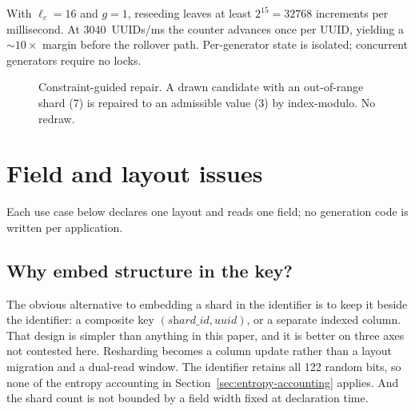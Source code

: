 \documentclass{svproc}
\begin{document}
With $\ell_c=16$ and $g=1$, reseeding leaves at least $2^{15}=32768$ increments per millisecond. At 3040~UUIDs/ms the counter advances once per UUID, yielding a $\sim10\times$ margin before the rollover path. Per-generator state is isolated; concurrent generators require no locks.

\begin{figure}[!ht]
\centering
{}
\caption{Constraint-guided repair. A drawn candidate with an out-of-range
shard (7) is repaired to an admissible value (3) by index-modulo.
No redraw.}
\label{fig:pipeline}
\end{figure}

\section{Field and layout issues}
\label{sec:applications}
Each use case below declares one layout and reads one field; no
generation code is written per application.

\subsection{Why embed structure in the key?}
\label{sec:why-embed}

The obvious alternative to embedding a shard in the identifier is to keep
it beside the identifier: a composite key
$(\textit{shard\_id}, \textit{uuid})$, or a separate indexed column. That
design is simpler than anything in this paper, and it is better on three
axes not contested here. Resharding becomes a column update rather than a
layout migration and a dual-read window. The identifier retains all 122
random bits, so none of the entropy accounting in
Section~\ref{sec:entropy-accounting} applies. And the shard count is not
bounded by a field width fixed at declaration time.
\end{document}

